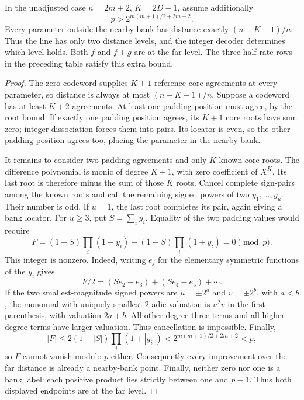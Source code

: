 \begin{proposition}
\label{pd:powers-two-level}
In the unadjusted case $n=2m+2$, $K=2D-1$, assume additionally
\[
 p>2^{m(m+1)/2+2m+2}.
\]
Every parameter outside the nearby bank has distance exactly
$(n-K-1)/n$. Thus the line has only two distance levels, and the
integer decoder determines which level holds. Both $f$ and $f+g$ are
at the far level. The three half-rate
rows in the preceding table satisfy this extra bound.
\end{proposition}
\begin{proof}
The zero codeword supplies $K+1$ reference-core agreements at every
parameter, so distance is always at most $(n-K-1)/n$. Suppose a codeword
has at least $K+2$ agreements. At least one padding position must agree,
by the root bound. If exactly one padding position agrees,
its $K+1$ core roots have sum zero; integer dissociation forces them
into pairs. Its locator is even, so the other padding position agrees
too, placing the parameter in the nearby bank.

It remains to consider two padding agreements and only $K$ known core
roots. The difference polynomial is monic of degree $K+1$, with zero
coefficient of $X^K$. Its last root is therefore minus the sum of those
$K$ roots. Cancel complete sign-pairs among the known roots and call
the remaining signed powers of two $y_1,\ldots,y_u$. Their number is
odd. If $u=1$, the last root completes its pair, again giving a bank
locator. For $u\ge3$, put $S=\sum_i y_i$. Equality of the two padding
values would require
\[
 F=(1+S)\prod_i(1-y_i)-(1-S)\prod_i(1+y_i)=0\pmod p.
\]
This integer is nonzero. Indeed, writing $e_j$ for the elementary
symmetric functions of the $y_i$ gives
\[
 F/2=(Se_2-e_3)+(Se_4-e_5)+\cdots.
\]
If the two smallest-magnitude signed powers are $u=\pm2^a$ and
$v=\pm2^b$, with $a<b$, the monomial with uniquely smallest $2$-adic
valuation is $u^2v$ in the first parenthesis, with valuation $2a+b$.
All other degree-three terms and all higher-degree terms have larger
valuation. Thus cancellation is impossible.
Finally,
\[
 |F|\le2(1+|S|)\prod_i(1+|y_i|)
 <2^{m(m+1)/2+2m+2}<p,
\]
so $F$ cannot vanish modulo $p$ either. Consequently every improvement
over the far distance is already a nearby-bank point. Finally, neither
zero nor one is a bank label: each positive product lies strictly between
one and $p-1$. Thus both displayed endpoints are at the far level.
\end{proof}
